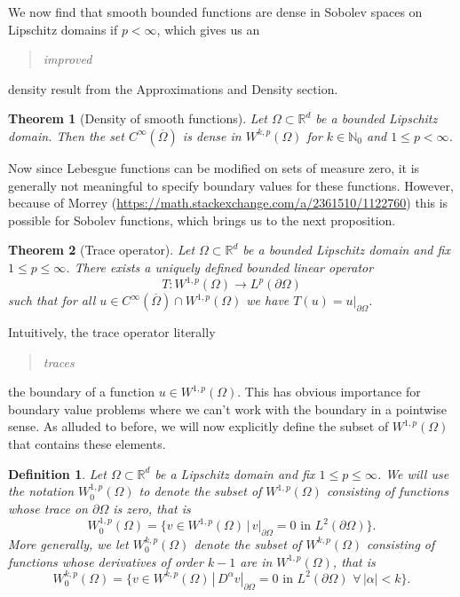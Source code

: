 \documentclass[11pt]{article}
\newtheorem{theorem}{Theorem}
\newtheorem{definition}{Definition}
\theoremstyle{definition}
\begin{document}
We now find that smooth bounded functions are dense in Sobolev spaces on Lipschitz domains if $p < \infty$, which gives us
an \blockquote{\textit{improved}} density result from the Approximations and Density section.

\begin{theorem}[Density of smooth functions]
	Let $\Omega \subset \mathbb{R}^d$ be a bounded Lipschitz domain. Then the set $C^{\infty}(\overline{\Omega})$ is dense
	in $W^{k,p}(\Omega)$ for $k \in \mathbb{N}_0$ and $1 \leq p < \infty$.
\end{theorem}

Now since Lebesgue functions can be modified on sets of measure zero, it is generally not meaningful to specify boundary values for these functions.
However, because of Morrey (\url{https://math.stackexchange.com/a/2361510/1122760}) this is possible for Sobolev functions, which brings us to the next proposition. 

\begin{theorem}[Trace operator]
	Let $\Omega \subset \mathbb{R}^d$ be a bounded Lipschitz domain and fix $1 \leq p \leq \infty$. There exists a uniquely defined bounded
	linear operator
	\begin{equation*}
		T : W^{1,p}(\Omega) \rightarrow L^p(\partial \Omega)
	\end{equation*}
	such that for all $u \in C^{\infty}(\overline{\Omega}) \cap W^{1,p}(\Omega)$ we have $T(u) = u|_{\partial \Omega}$.
\end{theorem}

Intuitively, the trace operator literally \blockquote{\textit{traces}} the boundary of a function $u \in W^{1,p}(\Omega)$.
This has obvious importance for boundary value problems where we can't work with the boundary in a pointwise sense.
As alluded to before, we will now explicitly define the subset of $W^{1,p}(\Omega)$ that contains these elements.

\begin{definition}
	Let $\Omega \subset \mathbb{R}^d$ be a Lipschitz domain and fix $1 \leq p \leq \infty$.
	We will use the notation $W_{0}^{1,p}(\Omega)$ to denote the subset of $W^{1,p}(\Omega)$ consisting of functions whose
	trace on $\partial \Omega$ is zero, that is
	\begin{equation*}
		W_{0}^{1,p}(\Omega) = \{v \in W^{1,p}(\Omega) \, | \, v|_{\partial \Omega} = 0 \text{ in } L^2(\partial \Omega)\}.
	\end{equation*}
	More generally, we let $W_{0}^{k,p}(\Omega)$ denote the subset of $W^{k,p}(\Omega)$ consisting of functions whose
	derivatives of order $k-1$ are in $W^{1,p}(\Omega)$, that is
	\begin{equation*}
		W_{0}^{k,p}(\Omega) = \{v \in W^{k,p}(\Omega) \, | \, D^{\alpha}v|_{\partial \Omega} = 0 \text{ in } L^2(\partial \Omega) \,\, \forall \, |\alpha| < k\}.
	\end{equation*}
\end{definition}
\end{document}
